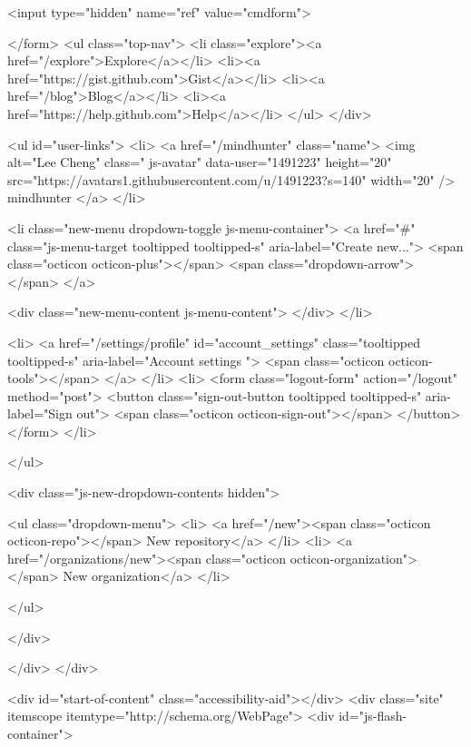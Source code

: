   <input type="hidden" name="ref" value="cmdform">

</form>
        <ul class="top-nav">
          <li class="explore"><a href="/explore">Explore</a></li>
            <li><a href="https://gist.github.com">Gist</a></li>
            <li><a href="/blog">Blog</a></li>
          <li><a href="https://help.github.com">Help</a></li>
        </ul>
      </div>

    


  <ul id="user-links">
    <li>
      <a href="/mindhunter" class="name">
        <img alt="Lee Cheng" class=" js-avatar" data-user="1491223" height="20" src="https://avatars1.githubusercontent.com/u/1491223?s=140" width="20" /> mindhunter
      </a>
    </li>

    <li class="new-menu dropdown-toggle js-menu-container">
      <a href="#" class="js-menu-target tooltipped tooltipped-s" aria-label="Create new...">
        <span class="octicon octicon-plus"></span>
        <span class="dropdown-arrow"></span>
      </a>

      <div class="new-menu-content js-menu-content">
      </div>
    </li>

    <li>
      <a href="/settings/profile" id="account_settings"
        class="tooltipped tooltipped-s"
        aria-label="Account settings ">
        <span class="octicon octicon-tools"></span>
      </a>
    </li>
    <li>
      <form class="logout-form" action="/logout" method="post">
        <button class="sign-out-button tooltipped tooltipped-s" aria-label="Sign out">
          <span class="octicon octicon-sign-out"></span>
        </button>
      </form>
    </li>

  </ul>

<div class="js-new-dropdown-contents hidden">
  

<ul class="dropdown-menu">
  <li>
    <a href="/new"><span class="octicon octicon-repo"></span> New repository</a>
  </li>
  <li>
    <a href="/organizations/new"><span class="octicon octicon-organization"></span> New organization</a>
  </li>


</ul>

</div>


    
  </div>
</div>

      

        



      <div id="start-of-content" class="accessibility-aid"></div>
          <div class="site" itemscope itemtype="http://schema.org/WebPage">
    <div id="js-flash-container">
      
